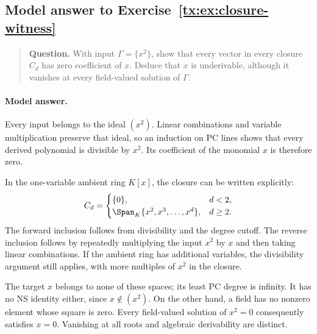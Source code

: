 \begin{samepage}

\subsection*{Model answer to Exercise~\ref{tx:ex:closure-witness}}\label{tx:ans:closure-witness}

\begin{quote}\small\textbf{Question.} With input $\Gamma=\{x^2\}$, show that every vector in every closure
$C_d$ has zero coefficient of $x$. Deduce that $x$ is underivable,
although it vanishes at every field-valued solution of $\Gamma$.
\end{quote}

\paragraph{Model answer.}
Every input belongs to the ideal \((x^2)\). Linear combinations and
variable multiplication preserve that ideal, so an induction on PC
lines shows that every derived polynomial is divisible by \(x^2\).
Its coefficient of the monomial \(x\) is therefore zero.
\end{samepage}

In the one-variable ambient ring \(K[x]\), the closure can be written
explicitly:
\[
 C_d=
 \begin{cases}
 \{0\},&d<2,\\
 \Span_K\{x^2,x^3,\ldots,x^d\},&d\ge2.
 \end{cases}
\]
The forward inclusion follows from divisibility and the degree
cutoff. The reverse inclusion follows by repeatedly multiplying the
input \(x^2\) by \(x\) and then taking linear combinations.
If the ambient ring has additional variables, the divisibility
argument still applies, with more multiples of \(x^2\) in the closure.

The target \(x\) belongs to none of these spaces; its least PC
degree is infinity. It has no NS identity either, since \(x\notin(x^2)\).
On the other hand, a field has no nonzero element whose square is
zero. Every field-valued solution of \(x^2=0\) consequently satisfies
\(x=0\). Vanishing at all roots and algebraic derivability are distinct.


\par


